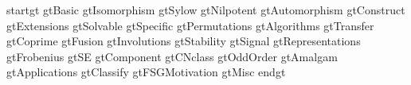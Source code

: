  {startgt}
 {gtBasic}
 {gtIsomorphism}
 {gtSylow}
 {gtNilpotent}
 {gtAutomorphism}
 {gtConstruct}
 {gtExtensions}
 {gtSolvable}
 {gtSpecific}
 {gtPermutations}
 {gtAlgorithms}
 {gtTransfer}
 {gtCoprime}
 {gtFusion}
 {gtInvolutions}
 {gtStability}
 {gtSignal}
 {gtRepresentations}
 {gtFrobenius}
 {gtSE}
 {gtComponent}
 {gtCNclass}
 {gtOddOrder}
 {gtAmalgam}
 {gtApplications}
 {gtClassify}
 {gtFSGMotivation}
 {gtMisc}
 {endgt}

